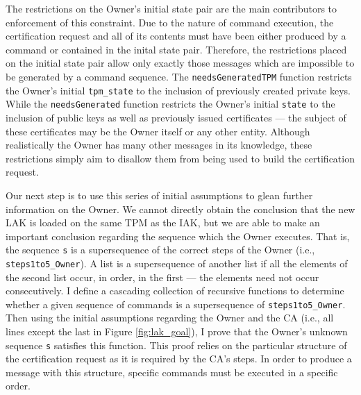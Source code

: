 The restrictions on the Owner's initial state pair are the main contributors to enforcement of this constraint. Due to the nature of command execution, the certification request and all of its contents must have been either produced by a command or contained in the inital state pair. 
Therefore, the restrictions placed on the initial state pair allow only exactly those messages which are impossible to be generated by a command sequence.
The \verb|needsGeneratedTPM| function restricts the Owner's initial \verb|tpm_state| to the inclusion of previously created private keys. While the \verb|needsGenerated| function restricts the Owner's initial \verb|state| to the inclusion of public keys as well as previously issued certificates --- the subject of these certificates may be the Owner itself or any other entity.
Although realistically the Owner has many other messages in its knowledge, these restrictions simply aim to disallow them from being used to build the certification request. 



Our next step is to use this series of initial assumptions to glean further information on the Owner. We cannot directly obtain the conclusion that the new LAK is  loaded on the same TPM as the IAK, but we are able to make an important conclusion regarding the sequence which the Owner executes. That is, the sequence \verb|s| is a supersequence of the correct steps of the Owner (i.e., \verb|steps1to5_Owner|). A list is a supersequence of another list if all the elements of the second list occur, in order, in the first --- the elements need not occur consecutively. I define a cascading collection of recursive functions to determine whether a given sequence of commands is a supersequence of \verb|steps1to5_Owner|. 
Then using the initial assumptions regarding the Owner and the CA (i.e., all lines except the last in Figure \ref{fig:lak_goal}), I prove that the Owner's unknown sequence \verb|s| satisfies this function. This proof relies on the particular structure of the certification request as it is required by the CA's steps. In order to produce a message with this structure, specific commands must be executed in a specific order.


